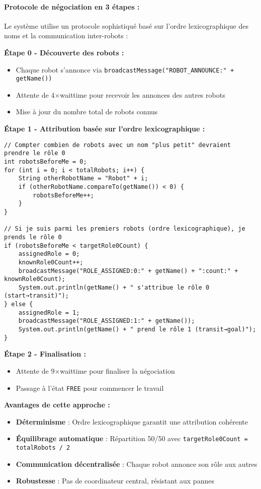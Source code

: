 \documentclass[12pt,a4paper]{article}
\newcommand{\code}[1]{\texttt{#1}}
\begin{document}
\paragraph{Protocole de négociation en 3 étapes :}

Le système utilise un protocole sophistiqué basé sur l'ordre lexicographique des noms et la communication inter-robots :

\textbf{Étape 0 - Découverte des robots :}
\begin{itemize}
    \item Chaque robot s'annonce via \code{broadcastMessage("ROBOT\_ANNOUNCE:" + getName())}
    \item Attente de 4×waittime pour recevoir les annonces des autres robots
    \item Mise à jour du nombre total de robots connus
\end{itemize}

\textbf{Étape 1 - Attribution basée sur l'ordre lexicographique :}
\begin{lstlisting}[caption=Attribution des rôles par ordre lexicographique]
// Compter combien de robots avec un nom "plus petit" devraient prendre le rôle 0
int robotsBeforeMe = 0;
for (int i = 0; i < totalRobots; i++) {
    String otherRobotName = "Robot" + i;
    if (otherRobotName.compareTo(getName()) < 0) {
        robotsBeforeMe++;
    }
}

// Si je suis parmi les premiers robots (ordre lexicographique), je prends le rôle 0
if (robotsBeforeMe < targetRole0Count) {
    assignedRole = 0;
    knownRole0Count++;
    broadcastMessage("ROLE_ASSIGNED:0:" + getName() + ":count:" + knownRole0Count);
    System.out.println(getName() + " s'attribue le rôle 0 (start→transit)");
} else {
    assignedRole = 1;
    broadcastMessage("ROLE_ASSIGNED:1:" + getName());
    System.out.println(getName() + " prend le rôle 1 (transit→goal)");
}
\end{lstlisting}

\textbf{Étape 2 - Finalisation :}
\begin{itemize}
    \item Attente de 9×waittime pour finaliser la négociation
    \item Passage à l'état \code{FREE} pour commencer le travail
\end{itemize}

\textbf{Avantages de cette approche :}
\begin{itemize}
    \item \textbf{Déterminisme} : Ordre lexicographique garantit une attribution cohérente
    \item \textbf{Équilibrage automatique} : Répartition 50/50 avec \code{targetRole0Count = totalRobots / 2}
    \item \textbf{Communication décentralisée} : Chaque robot annonce son rôle aux autres
    \item \textbf{Robustesse} : Pas de coordinateur central, résistant aux pannes
\end{itemize}
\end{document}
